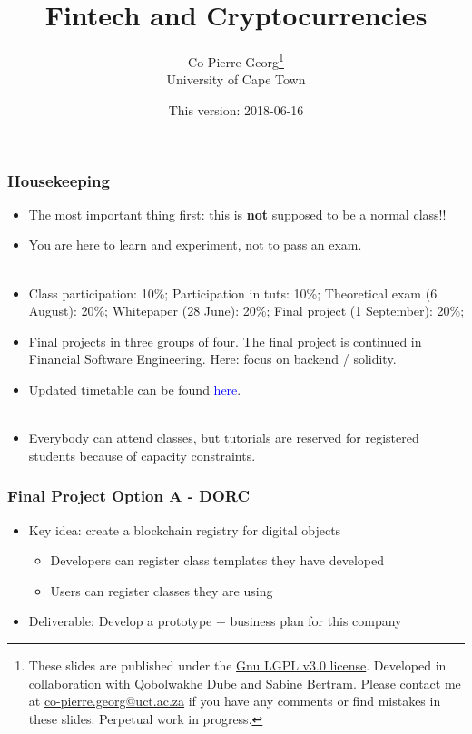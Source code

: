 \documentclass[11pt]{beamer}
\title
{Fintech and Cryptocurrencies}
\author[Co-Pierre Georg]
{
Co-Pierre Georg\footnote{These slides are published under the \href{https://www.gnu.org/licenses/lgpl-3.0.en.html}{Gnu LGPL v3.0 license}. Developed in collaboration with Qobolwakhe Dube and Sabine Bertram. Please contact me at \url{co-pierre.georg@uct.ac.za} if you have any comments or find mistakes in these slides. Perpetual work in progress.}\\
University of Cape Town
}
\date
{This version: 2018-06-16}
\begin{document}
\begin{frame}
  \titlepage
\end{frame}

\begin{frame}
  \frametitle{Housekeeping}
  \begin{itemize}
    \item The most important thing first: this is \textbf{not} supposed to be a normal class!!
    \item You are here to learn and experiment, not to pass an exam.\\
    ~\\
    \pause
    \item Class participation: 10\%; Participation in tuts: 10\%; Theoretical exam (6 August): 20\%; Whitepaper (28 June): 20\%; Final project (1 September): 20\%;\\
    \item Final projects in three groups of four. The final project is continued in Financial Software Engineering. Here: focus on backend / solidity.
    ~\\
    \pause
    \item Updated timetable can be found \href{https://docs.google.com/spreadsheets/d/1pKzULj4H33-thAPFxcg1UaOOD9w4S7uBTE4fMKJN8kA/edit?usp=sharing}{\textcolor{blue}{here}}.\\
    ~\\
    \pause
    \item Everybody can attend classes, but tutorials are reserved for registered students because of capacity constraints.
  \end{itemize}
\end{frame}

\begin{frame}
  \frametitle{Final Project Option A - DORC}
  \begin{itemize}\itemsep10pt
    \item Key idea: create a blockchain registry for digital objects
    \begin{itemize}\itemsep5pt
      \item Developers can register class templates they have developed
      \item Users can register classes they are using
    \end{itemize}
    \item Deliverable: Develop a prototype + business plan for this company
  \end{itemize}
\end{frame}
\end{document}
